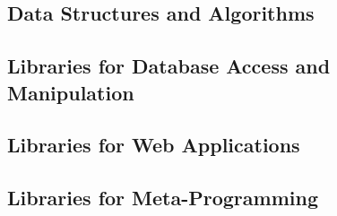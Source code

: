 {\subsection{Data Structures and Algorithms}
















\subsection{Libraries for Database Access and Manipulation}











\subsection{Libraries for Web Applications}









\subsection{Libraries for Meta-Programming}
















} %


